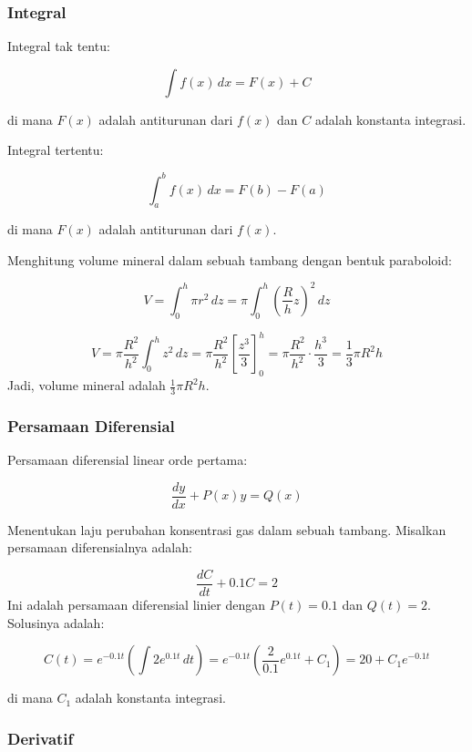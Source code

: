 \documentclass[
]{book}
\begin{document}
\subsubsection*{Integral}\label{integral}

Integral tak tentu:

\[\int f(x) \, dx = F(x) + C\]

di mana \(F(x)\) adalah antiturunan dari \(f(x)\) dan \(C\) adalah konstanta integrasi.

Integral tertentu:

\[
  \int_a^b f(x) \, dx = F(b) - F(a)
\]

di mana \(F(x)\) adalah antiturunan dari \(f(x)\).

Menghitung volume mineral dalam sebuah tambang dengan bentuk paraboloid:

\[
  V = \int_0^h \pi r^2 \, dz = \pi \int_0^h \left( \frac{R}{h} z \right)^2 \, dz
\]

\[
  V = \pi \frac{R^2}{h^2} \int_0^h z^2 \, dz = \pi \frac{R^2}{h^2} \left[ \frac{z^3}{3} \right]_0^h = \pi \frac{R^2}{h^2} \cdot \frac{h^3}{3} = \frac{1}{3} \pi R^2 h
\]
Jadi, volume mineral adalah \(\frac{1}{3} \pi R^2 h\).

\subsubsection*{Persamaan Diferensial}\label{persamaan-diferensial}

Persamaan diferensial linear orde pertama:

\[
  \frac{dy}{dx} + P(x)y = Q(x)
\]

Menentukan laju perubahan konsentrasi gas dalam sebuah tambang. Misalkan persamaan diferensialnya adalah:

\[
  \frac{dC}{dt} + 0.1C = 2
\]
Ini adalah persamaan diferensial linier dengan \(P(t) = 0.1\) dan \(Q(t) = 2\). Solusinya adalah:

\[
  C(t) = e^{-0.1t} \left( \int 2 e^{0.1t} \, dt \right) = e^{-0.1t} \left( \frac{2}{0.1} e^{0.1t} + C_1 \right) = 20 + C_1 e^{-0.1t}
\]

di mana \(C_1\) adalah konstanta integrasi.

\subsubsection*{Derivatif}\label{derivatif}
\end{document}
